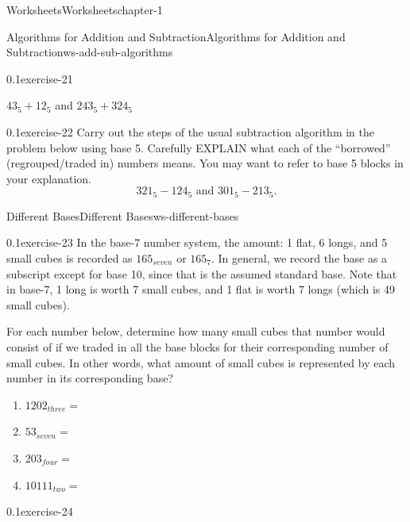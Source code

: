 \documentclass[twoside,11pt,]{book}
\begin{document}
\begin{chapterptx}{Worksheets}{}{Worksheets}{}{}{chapter-1}
\begin{worksheet-section-numberless}{Algorithms for Addition and Subtraction}{}{Algorithms for Addition and Subtraction}{}{}{ws-add-sub-algorithms}
\begin{divisionexercise}{1}{}{0.1}{exercise-21}
\par
\hypertarget{p-41}{}%
\(43_{5}+12_{5}\) and \(243_{5}+324_{5}\)%
\end{divisionexercise}%
\clearpage
\begin{divisionexercise}{2}{}{0.1}{exercise-22}%
\hypertarget{p-42}{}%
Carry out the steps of the usual subtraction algorithm in the problem below using base 5.  Carefully EXPLAIN what each of the ``borrowed'' (regrouped\slash{}traded in) numbers means.  You may want to refer to base 5 blocks in your explanation.%
\begin{equation*}
321_{5}-124_5 \text{ and } 301_5-213_5 \text{.}
\end{equation*}
%
\end{divisionexercise}%
\end{worksheet-section-numberless}
\restoregeometry
%
%
\typeout{************************************************}
\typeout{************************************************}
%
\begin{worksheet-section-numberless}{Different Bases}{}{Different Bases}{}{}{ws-different-bases}
\begin{divisionexercise}{1}{}{0.1}{exercise-23}%
\hypertarget{p-43}{}%
In the base-7 number system, the amount: 1 flat, 6 longs, and 5 small cubes is recorded as \(165_{seven}\) or \(165_7\). In general, we record the base as a subscript except for base 10, since that is the assumed standard base.  Note that in base-7, 1 long is worth 7 small cubes, and 1 flat is worth 7 longs (which is 49 small cubes).%
\par
\hypertarget{p-44}{}%
For each number below, determine how many small cubes that number would consist of if we traded in all the base blocks for their corresponding number of small cubes.  In other words, what amount of small cubes is represented by each number in its corresponding base?%
\leavevmode%
\begin{enumerate}[label=(\alph*)]
\item\hypertarget{li-1}{}\(1202_{three}   = \)%
\item\hypertarget{li-2}{}\(53_{seven}       = \)%
\item\hypertarget{li-3}{}\(203_{four}       = \)%
\item\hypertarget{li-4}{}\(10111_{two}       = \)%
\end{enumerate}
\end{divisionexercise}%
\begin{divisionexercise}{2}{}{0.1}{exercise-24}%

\end{divisionexercise}
\end{worksheet-section-numberless}
\end{chapterptx}
\end{document}
